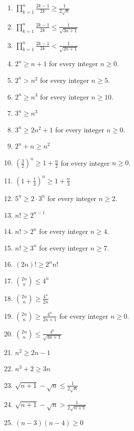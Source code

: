 \documentclass[11pt,a4paper]{article}
\begin{document}
\begin{enumerate}
\item $\displaystyle \prod_{k=1}^{n} \frac{2k - 1}{2k} \ge \frac{1}{2\sqrt{n}}$
\item $\displaystyle \prod_{k=1}^{n} \frac{2k - 1}{2k} \le \frac{1}{\sqrt{3n + 1}}$
\item $\displaystyle \prod_{k=1}^{n} \frac{2k - 1}{2k} < \frac{1}{\sqrt{2n + 1}}$
\item $\displaystyle 2^{n} \ge n + 1$ for every integer $n\ge 0$.
\item $\displaystyle 2^{n} > n^{2}$ for every integer $n\ge 5$.
\item $\displaystyle 2^{n} \ge n^{3}$ for every integer $n\ge 10$.
\item $\displaystyle 3^{n} \ge n^{3}$
\item $\displaystyle 3^{n} \ge 2n^{2} + 1$ for every integer $n\ge 0$.
\item $\displaystyle 2^{n} + n \ge n^{2}$
\item $\displaystyle \left(\frac{3}{2}\right)^{n} \ge 1 + \frac{n}{2}$ for every integer $n\ge 0$.
\item $\displaystyle \left(1 + \frac{1}{3}\right)^{n} \ge 1 + \frac{n}{3}$
\item $\displaystyle 5^{n} \ge 2 \cdot 3^{n}$ for every integer $n\ge 2$.
\item $\displaystyle n! \ge 2^{n - 1}$
\item $\displaystyle n! > 2^{n}$ for every integer $n\ge 4$.
\item $\displaystyle n! \ge 3^{n}$ for every integer $n\ge 7$.
\item $\displaystyle \left(2n\right)! \ge 2^{n} n!$
\item $\displaystyle \binom{2n}{n} \le 4^{n}$
\item $\displaystyle \binom{2n}{n} \ge \frac{4^{n}}{2n}$
\item $\displaystyle \binom{2n}{n} \ge \frac{4^{n}}{2n + 1}$ for every integer $n\ge 0$.
\item $\displaystyle \binom{2n}{n} \le \frac{4^{n}}{\sqrt{3n + 1}}$
\item $\displaystyle n^{2} \ge 2n - 1$
\item $\displaystyle n^{3} + 2 \ge 3n$
\item $\displaystyle \sqrt{n + 1} - \sqrt{n} \le \frac{1}{2\sqrt{n}}$
\item $\displaystyle \sqrt{n + 1} - \sqrt{n} > \frac{1}{2\sqrt{n + 1}}$
\item $\displaystyle \left(n - 3\right)\left(n - 4\right) \ge 0$
\end{enumerate}
\end{document}

